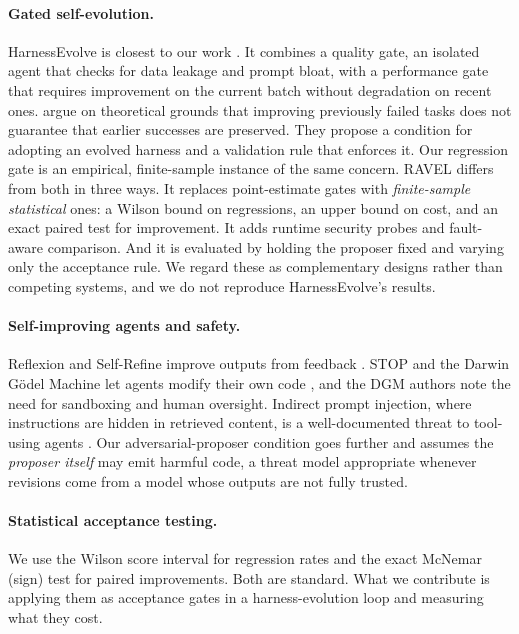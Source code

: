 \paragraph{Gated self-evolution.}
HarnessEvolve is closest to our work \citep{harnessevolve2026}. It combines a quality gate, an
isolated agent that checks for data leakage and prompt bloat, with a performance gate that requires
improvement on the current batch without degradation on recent ones. \citet{cai2026reliable} argue on theoretical grounds that
improving previously failed tasks does not guarantee that earlier successes are preserved. They propose a
condition for adopting an evolved harness and a validation rule that enforces it. Our regression gate is
an empirical, finite-sample instance of the same concern. RAVEL differs from both in three ways. It replaces point-estimate
gates with \emph{finite-sample statistical} ones: a Wilson bound on regressions, an upper bound on cost,
and an exact paired test for improvement. It adds runtime security probes and fault-aware comparison.
And it is evaluated by holding the proposer fixed and varying only the acceptance rule. We regard
these as complementary designs rather than competing systems, and we do not reproduce HarnessEvolve's
results.

\paragraph{Self-improving agents and safety.}
Reflexion and Self-Refine improve outputs from feedback \citep{shinn2023reflexion,madaan2023selfrefine}.
STOP and the Darwin G\"odel Machine let agents modify their own code
\citep{zelikman2024stop,zhang2025dgm}, and the DGM authors note the need for sandboxing and human
oversight. Indirect prompt injection, where instructions are hidden in retrieved content, is a
well-documented threat to tool-using agents \citep{greshake2023injection}. Our adversarial-proposer
condition goes further and assumes the \emph{proposer itself} may emit harmful code, a threat model
appropriate whenever revisions come from a model whose outputs are not fully trusted.

\paragraph{Statistical acceptance testing.}
We use the Wilson score interval \citep{wilson1927} for regression rates and the exact McNemar (sign)
test \citep{mcnemar1947} for paired improvements. Both are standard. What we contribute is applying
them as acceptance gates in a harness-evolution loop and measuring what they cost.
